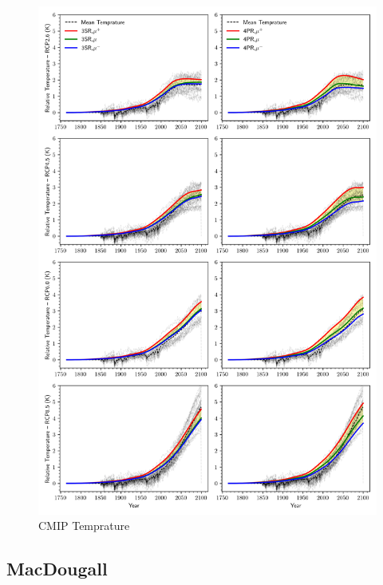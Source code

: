 \documentclass[11pt, a4paper, pdftex, twoside, dvipsnames]{article}
\begin{document}
\begin{figure}
    \centering
    \includegraphics[width=\textwidth]{fig/simulate_cmip_temp.png}
    \caption{CMIP Temprature}
\end{figure}


\subsection{MacDougall}
\end{document}
